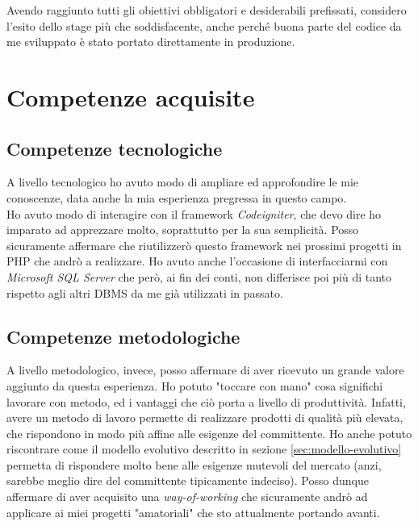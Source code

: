 Avendo raggiunto tutti gli obiettivi obbligatori e desiderabili prefissati, considero l'esito dello stage più che soddisfacente, anche perché buona parte del codice da me sviluppato è stato portato direttamente in produzione.
\section{Competenze acquisite}
\subsection{Competenze tecnologiche}
A livello tecnologico ho avuto modo di ampliare ed approfondire le mie conoscenze, data anche la mia esperienza pregressa in questo campo.\\ Ho avuto modo di interagire con il \gls{framework} \textit{Codeigniter}, che devo dire ho imparato ad apprezzare molto, soprattutto per la sua semplicità. Posso sicuramente affermare che riutilizzerò questo \gls{framework} nei prossimi progetti in PHP che andrò a realizzare. Ho avuto anche l'occasione di interfacciarmi con \textit{Microsoft SQL Server} che però, ai fin dei conti, non differisce poi più di tanto rispetto agli altri \gls{DBMS} da me già utilizzati in passato.
\subsection{Competenze metodologiche}
A livello metodologico, invece, posso affermare di aver ricevuto un grande valore aggiunto da questa esperienza. Ho potuto "toccare con mano" cosa significhi lavorare con metodo, ed i vantaggi che ciò porta a livello di produttività. Infatti, avere un metodo di lavoro permette di realizzare prodotti di qualità più elevata, che rispondono in modo più affine alle esigenze del committente. Ho anche potuto riscontrare come il modello evolutivo descritto in sezione \ref{sec:modello-evolutivo} permetta di rispondere molto bene alle esigenze mutevoli del mercato (anzi, sarebbe meglio dire del committente tipicamente indeciso). Posso dunque affermare di aver acquisito una \textit{way-of-working} che sicuramente andrò ad applicare ai miei progetti "amatoriali" che sto attualmente portando avanti.
